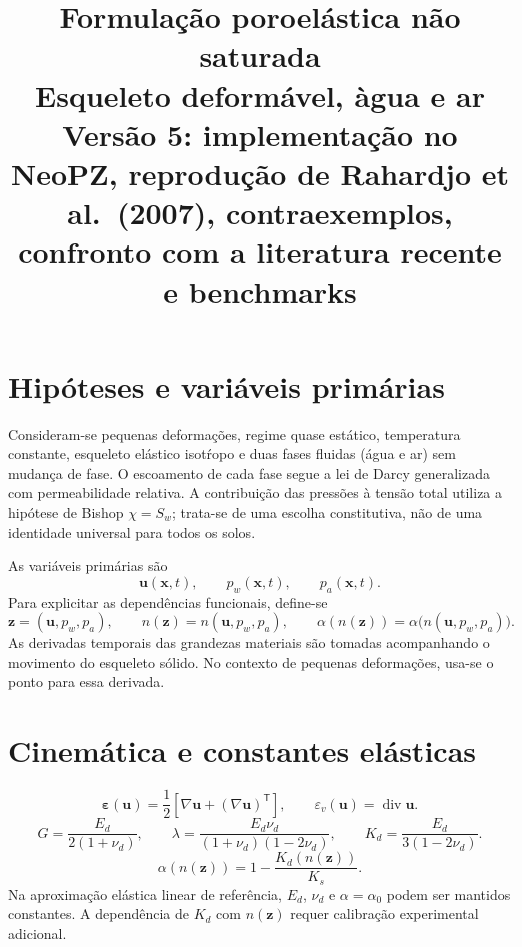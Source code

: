 \documentclass[11pt,a4paper]{article}
\title{Formula\c{c}\~ao poroel\'astica n\~ao saturada\\
\large Esqueleto deform\'avel, \`agua e ar\\[2pt]
\normalsize Vers\~ao 5: implementa\c{c}\~ao no NeoPZ, reprodu\c{c}\~ao de Rahardjo et al.\ (2007), contraexemplos,
confronto com a literatura recente e benchmarks}
\author{}
\date{}
\numberwithin{equation}{section}
\newcommand{\Div}{\operatorname{div}}
\begin{document}
\maketitle
\vspace{-2em}

\section{Hip\'oteses e vari\'aveis prim\'arias}

Consideram-se pequenas deforma\c{c}\~oes, regime quase est\'atico,
temperatura constante, esqueleto el\'astico isot\'ropo e duas fases fluidas
(\'agua e ar) sem mudan\c{c}a de fase. O escoamento de cada fase segue
a lei de Darcy generalizada com permeabilidade relativa. A contribui\c{c}\~ao
das press\~oes \`a tens\~ao total utiliza a hip\'otese de Bishop
$\chi=S_w$; trata-se de uma escolha constitutiva, n\~ao de uma identidade
universal para todos os solos.

As vari\'aveis prim\'arias s\~ao
\begin{equation}
\boxed{\mathbf u(\mathbf x,t),\qquad p_w(\mathbf x,t),\qquad p_a(\mathbf x,t).}
\end{equation}
Para explicitar as depend\^encias funcionais, define-se
\begin{equation}
\mathbf z=(\mathbf u,p_w,p_a),\qquad
n(\mathbf z)=n(\mathbf u,p_w,p_a),\qquad
\alpha(n(\mathbf z))=\alpha\bigl(n(\mathbf u,p_w,p_a)\bigr).
\end{equation}
As derivadas temporais das grandezas materiais s\~ao tomadas acompanhando
o movimento do esqueleto s\'olido. No contexto de pequenas deforma\c{c}\~oes,
usa-se o ponto para essa derivada.

\section{Cinem\'atica e constantes el\'asticas}

\begin{equation}
\boxed{\boldsymbol\varepsilon(\mathbf u)=
\frac12\left[\nabla\mathbf u+(\nabla\mathbf u)^{\mathsf T}\right],
\qquad \varepsilon_v(\mathbf u)=\Div\mathbf u.}
\end{equation}
\begin{equation}
G=\frac{E_d}{2(1+\nu_d)},\qquad
\lambda=\frac{E_d\nu_d}{(1+\nu_d)(1-2\nu_d)},\qquad
K_d=\frac{E_d}{3(1-2\nu_d)}.
\end{equation}
\begin{equation}
\boxed{\alpha(n(\mathbf z))=1-\frac{K_d(n(\mathbf z))}{K_s}.}
\end{equation}
Na aproxima\c{c}\~ao el\'astica linear de refer\^encia, $E_d$, $\nu_d$
e $\alpha=\alpha_0$ podem ser mantidos constantes. A depend\^encia de
$K_d$ com $n(\mathbf z)$ requer calibra\c{c}\~ao experimental adicional.
\end{document}
